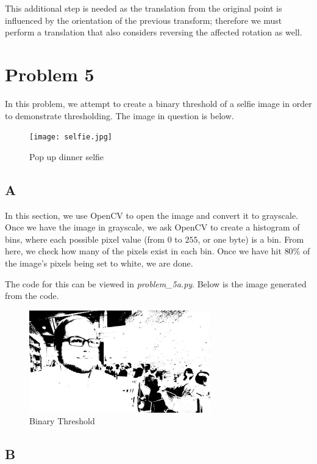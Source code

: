 \documentclass{article}
\begin{document}
This additional step is needed as the translation from the original point is influenced by the orientation of the previous transform; therefore we must perform a translation that also considers reversing the affected rotation as well.

\section*{Problem 5}

In this problem, we attempt to create a binary threshold of a selfie image in order to demonstrate thresholding. The image in question is below.

\begin{figure}[H]
    \centering
    \texttt{[image: selfie.jpg]}
    \caption{Pop up dinner selfie}
    \label{fig:selfie}
\end{figure}

\subsection*{A}

In this section, we use OpenCV to open the image and convert it to grayscale. Once we have the image in grayscale, we ask OpenCV to create a histogram of bins, where each possible pixel value (from $0$ to $255$, or one byte) is a bin. From here, we check how many of the pixels exist in each bin. Once we have hit $80\%$ of the image's pixels being set to white, we are done.

The code for this can be viewed in \textit{problem\_5a.py}. Below is the image generated from the code.

\begin{figure}[H]
    \centering
    \includegraphics[width = 0.7\textwidth]{imgs/binary_threshold.jpg}
    \caption{Binary Threshold}
    \label{fig:problem5a}
\end{figure}

\subsection*{B}
\end{document}
